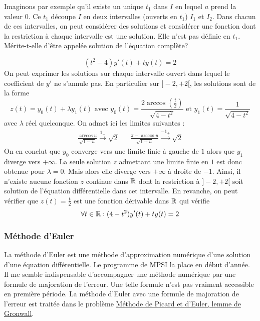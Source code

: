 Imaginons par exemple qu'il existe un unique $t_1$ dans $I$ en lequel $a$ prend la valeur $0$. Ce $t_1$ découpe $I$ en deux intervalles (ouverts en $t_1$) $I_1$ et $I_2$. Dans chacun de ces intervalles, on peut considérer des solutions et considérer une fonction dont la restriction à chaque intervalle est une solution. Elle n'est pas définie en $t_1$. Mérite-t-elle d'être appelée solution de l'équation complète?
\begin{exple}
 \begin{displaymath}
  (t^2-4)y'(t) + ty(t)= 2
 \end{displaymath}
On peut exprimer les solutions sur chaque intervalle ouvert dans lequel le coefficient de $y'$ ne s'annule pas.\newline
En particulier sur $]-2,+2[$, les solutions sont de la forme
\begin{displaymath}
 z(t) = y_0(t) + \lambda y_1(t) \text{ avec } y_0(t)=\frac{2\arccos(\frac{t}{2})}{\sqrt{4-t^2}} \text{ et } y_1(t)=\frac{1}{\sqrt{4-t^2}}
\end{displaymath}
avec $\lambda$ réel quelconque. On admet ici les limites suivantes :
\begin{align*}
 \frac{\arccos u}{\sqrt{1-u}}\xrightarrow{1_-} \sqrt{2}
& & 
 \frac{\pi - \arccos u}{\sqrt{1+u}}\xrightarrow{-1_+} \sqrt{2}
\end{align*}
On en conclut que $y_0$ converge vers une limite finie à gauche de $1$ alors que $y_1$ diverge vers $+\infty$. La seule solution $z$ admettant une limite finie en $1$ est donc obtenue pour $\lambda=0$. Mais alors elle diverge vers $+\infty$ à droite de $-1$.\newline
Ainsi, il n'existe aucune fonction $z$ continue dans $\mathbb{R}$ dont la restriction à $]-2,+2[$ soit solution de l'équation différentielle dans cet intervalle.\newline
En revanche, on peut vérifier que $z(t)=\frac{t}{2}$ est une fonction dérivable dans $\mathbb{R}$ qui vérifie
\begin{displaymath}
 \forall t \in \mathbb{R}: (4-t^2)y'(t) + ty(t)= 2
\end{displaymath}
\end{exple}

\subsubsection{Méthode d'Euler}
La méthode d'Euler est une méthode d'approximation numérique d'une solution d'une équation différentielle. Le programme de MPSI la place en début d'année. Il me semble indispensable d'accompagner une méthode numérique par une formule de majoration de l'erreur. Une telle formule n'est pas vraiment accessible en première période.\newline
La méthode d'Euler avec une formule de majoration de l'erreur est traitée dans le problème \href{http://back.maquisdoc.net/data/devoirs_nicolair/Aapprox1.pdf}{Méthode de Picard et d'Euler, lemme de Gronwall}.
